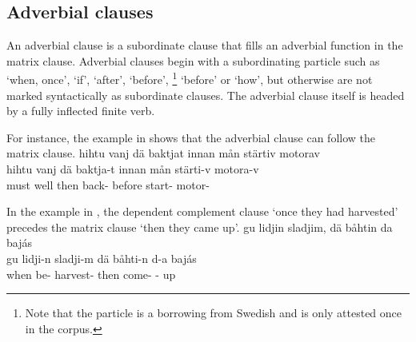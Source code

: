 \subsection{Adverbial clauses}\label{adverbialClauses}
An adverbial clause is a subordinate clause that fills an adverbial function in the matrix clause. %
Adverbial clauses begin with a subordinating particle such as  ‘when, once’,  ‘if’,  ‘after’,  ‘before’, \footnote{Note that the particle  is a borrowing from Swedish and is only attested once in the corpus.} ‘before’ %
or  ‘how’, %
but otherwise are not marked syntactically as subordinate clauses. The adverbial clause itself is headed by a fully inflected finite verb.%

For instance, the example in  shows that the adverbial clause can follow the matrix clause.%
\ea\label{adverbialClause1}%
\glll	hihtu vanj dä baktjat innan mån stärtiv motorav\\
	hihtu vanj dä baktja-t innan mån stärti-v motora-v\\
	must\BS{} well then back- before  start- motor-\\\nopagebreak
{} 
\z

In the example in , the dependent complement clause  ‘once they had harvested’ precedes the matrix clause  ‘then they came up’. %
\ea\label{adverbialClause2}%
\glll	gu lidjin sladjim, dä båhtin da bajás\\
	gu lidji-n sladji-m dä båhti-n d-a bajás\\
	when be- harvest- then come- -\BS{} up\\\nopagebreak
{} 
\z



